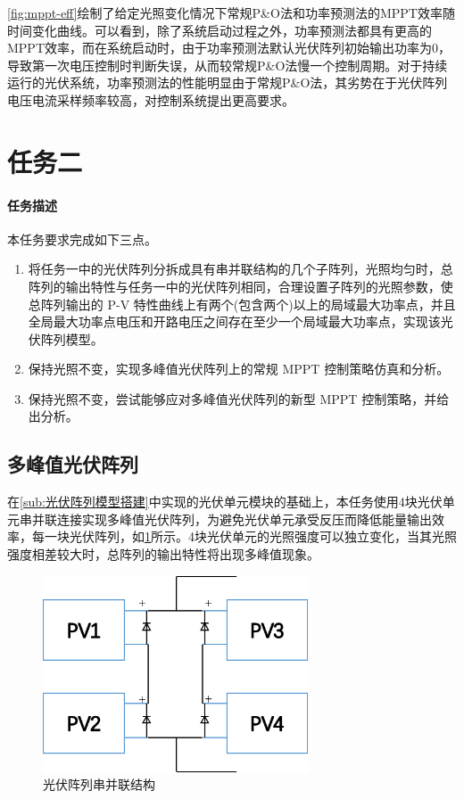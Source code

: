 \documentclass[a4paper,12pt]{article}
\begin{document}
    \cref{fig:mppt-eff}绘制了给定光照变化情况下常规P\&O法和功率预测法的MPPT效率随时间变化曲线。可以看到，除了系统启动过程之外，功率预测法都具有更高的MPPT效率，而在系统启动时，由于功率预测法默认光伏阵列初始输出功率为0，导致第一次电压控制时判断失误，从而较常规P\&O法慢一个控制周期。对于持续运行的光伏系统，功率预测法的性能明显由于常规P\&O法，其劣势在于光伏阵列电压电流采样频率较高，对控制系统提出更高要求。

    \section{任务二} %
    \label{sec:任务二}
    \paragraph{任务描述} %
    本任务要求完成如下三点。
    \begin{enumerate}[noitemsep,topsep=0pt]
    \item 将任务一中的光伏阵列分拆成具有串并联结构的几个子阵列，光照均匀时，总阵列的输出特性与任务一中的光伏阵列相同，合理设置子阵列的光照参数，使总阵列输出的 P-V 特性曲线上有两个(包含两个)以上的局域最大功率点，并且全局最大功率点电压和开路电压之间存在至少一个局域最大功率点，实现该光伏阵列模型。
    \item 保持光照不变，实现多峰值光伏阵列上的常规 MPPT 控制策略仿真和分析。
    \item 保持光照不变，尝试能够应对多峰值光伏阵列的新型 MPPT 控制策略，并给出分析。
    \end{enumerate}
    \subsection{多峰值光伏阵列} %
    \label{sub:多峰值光伏阵列}
    在\cref{sub:光伏阵列模型搭建}中实现的光伏单元模块的基础上，本任务使用4块光伏单元串并联连接实现多峰值光伏阵列，为避免光伏单元承受反压而降低能量输出效率，每一块光伏阵列，如\cref{fig:pvarray}所示。4块光伏单元的光照强度可以独立变化，当其光照强度相差较大时，总阵列的输出特性将出现多峰值现象。
    \begin{figure}[htbp]
        \centering
        \includegraphics[width=0.7\textwidth]{pvarray.png}
        \caption{光伏阵列串并联结构}
        \label{fig:pvarray}
    \end{figure}
\end{document}
